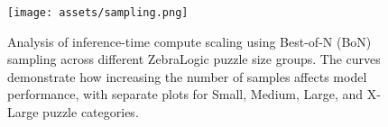 

\begin{figure}[t]
    \centering
    \texttt{[image: assets/sampling.png]}
    \caption{
    Analysis of inference-time compute scaling using Best-of-N (BoN) sampling across different ZebraLogic puzzle size groups. The curves demonstrate how increasing the number of samples affects model performance, with separate plots for Small, Medium, Large, and X-Large puzzle categories.
    }
    \label{fig:sampling}
\end{figure}





